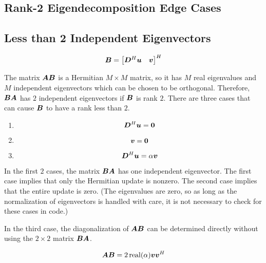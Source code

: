 \begin{appendices}
\chapter{Rank-2 Eigendecomposition Edge Cases} \label{chapter:eigenedge}

\section{Less than 2 Independent Eigenvectors}

\begin{equation}
\bm{B} = \begin{bmatrix} \bm{D}^H\bm{u} & \bm{v}\end{bmatrix}^H
\end{equation}


The matrix $\bm{A}\bm{B}$ is a Hermitian $M \times M$ matrix, so it has $M$ real eigenvalues and $M$ independent eigenvectors which can be chosen to be orthogonal. Therefore, $\bm{B}\bm{A}$ has $2$ independent eigenvectors if $\bm{B}$ is rank $2$.  There are three cases that can cause $\bm{B}$ to have a rank less than $2$.


\begin{enumerate}
\item
\begin{equation}
\bm{D}^H\bm{u} = \bm{0}
\end{equation}
\item

\begin{equation}
\bm{v} = \bm{0}
\end{equation}
\item
\begin{equation}
\bm{D}^H\bm{u} = \alpha \bm{v}
\end{equation}
\end{enumerate}

In the first $2$ cases, the matrix $\bm{B}\bm{A}$ has one independent eigenvector. The first case implies that only the Hermitian update is nonzero.  The second case implies that the entire update is zero. (The eigenvalues are zero, so as long as the normalization of eigenvectors is handled with care, it is not necessary to check for these cases in code.)

In the third case, the diagonalization of $\bm{A}\bm{B}$ can be determined directly without using the $2 \times 2$ matrix $\bm{B}\bm{A}$.

\begin{equation}
\bm{A}\bm{B} = 2\operatorname{real}(\alpha)\bm{v}\bm{v}^H
\end{equation}


\end{appendices}
